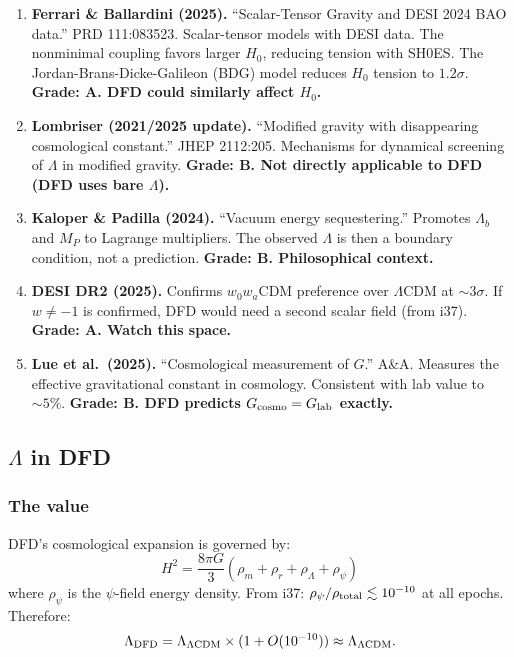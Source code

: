 \documentclass[11pt,a4paper]{article}
\begin{document}
\begin{enumerate}
\item \textbf{Ferrari \& Ballardini (2025).} ``Scalar-Tensor Gravity and DESI 2024 BAO data.'' PRD 111:083523. Scalar-tensor models with DESI data. The nonminimal coupling favors larger $H_0$, reducing tension with SH0ES. The Jordan-Brans-Dicke-Galileon (BDG) model reduces $H_0$ tension to $1.2\sigma$. \textbf{Grade: A. DFD could similarly affect $H_0$.}

\item \textbf{Lombriser (2021/2025 update).} ``Modified gravity with disappearing cosmological constant.'' JHEP 2112:205. Mechanisms for dynamical screening of $\Lambda$ in modified gravity. \textbf{Grade: B. Not directly applicable to DFD (DFD uses bare $\Lambda$).}

\item \textbf{Kaloper \& Padilla (2024).} ``Vacuum energy sequestering.'' Promotes $\Lambda_b$ and $M_P$ to Lagrange multipliers. The observed $\Lambda$ is then a boundary condition, not a prediction. \textbf{Grade: B. Philosophical context.}

\item \textbf{DESI DR2 (2025).} Confirms $w_0 w_a$CDM preference over $\Lambda$CDM at $\sim 3\sigma$. If $w \neq -1$ is confirmed, DFD would need a second scalar field (from i37). \textbf{Grade: A. Watch this space.}

\item \textbf{Lue et al.\ (2025).} ``Cosmological measurement of $G$.'' A\&A. Measures the effective gravitational constant in cosmology. Consistent with lab value to $\sim 5\%$. \textbf{Grade: B. DFD predicts $G_{\rm cosmo} = G_{\rm lab}$ exactly.}
\end{enumerate}

\subsection{$\Lambda$ in DFD}

\subsubsection{The value}

DFD's cosmological expansion is governed by:
\begin{equation}
H^2 = \frac{8\pi G}{3}(\rho_m + \rho_r + \rho_\Lambda + \rho_\psi)
\end{equation}
where $\rho_\psi$ is the $\psi$-field energy density. From i37: $\rho_\psi/\rho_{\rm total} \lesssim 10^{-10}$ at all epochs. Therefore:
\begin{equation}
\Lambda_{\rm DFD} = \Lambda_{\Lambda\text{CDM}} \times (1 + O(10^{-10})) \approx \Lambda_{\Lambda\text{CDM}}.
\end{equation}
\end{document}
